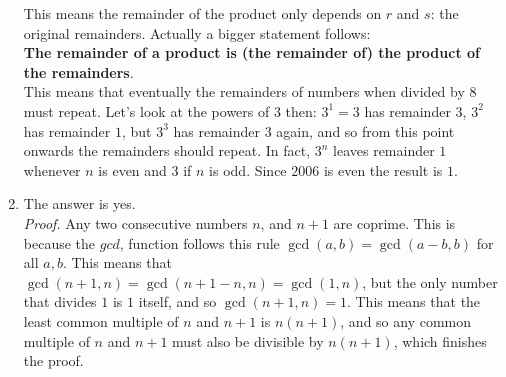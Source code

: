 \documentclass[11pt]{scrartcl}
\begin{document}
\begin{enumerate}[label=\textbf{N\arabic*}.]
    This means the remainder of the product only depends on $r$ and $s$: the original remainders. Actually a bigger statement follows: \\
    \textbf{The remainder of a product is (the remainder of) the product of the remainders}.\\ This means that eventually the remainders of numbers when divided by $8$ must repeat. Let's look at the powers of $3$ then: $3^1 = 3$ has remainder $3$, $3^2$ has remainder $1$, but $3^3$ has remainder $3$ again, and so from this point onwards the remainders should repeat. In fact, $3^n$ leaves remainder $1$ whenever $n$ is even and $3$ if $n$ is odd. Since $2006$ is even the result is $\boxed{1}$.
    
    \item The answer is yes.\\
    \textit{Proof.} Any two consecutive numbers $n$, and $n+1$ are coprime. This is because the $gcd$, function follows this rule $\gcd(a,b) = \gcd(a-b,b)$ for all $a,b$. This means that $\gcd(n+1,n) = \gcd(n+1-n,n) = \gcd(1,n)$, but the only number that divides $1$ is $1$ itself, and so $\gcd(n+1,n) = 1$. This means that the least common multiple of $n$ and $n+1$ is $n(n+1)$, and so any common multiple of $n$ and $n+1$ must also be divisible by $n(n+1)$, which finishes the proof.
\end{enumerate}
\end{document}
